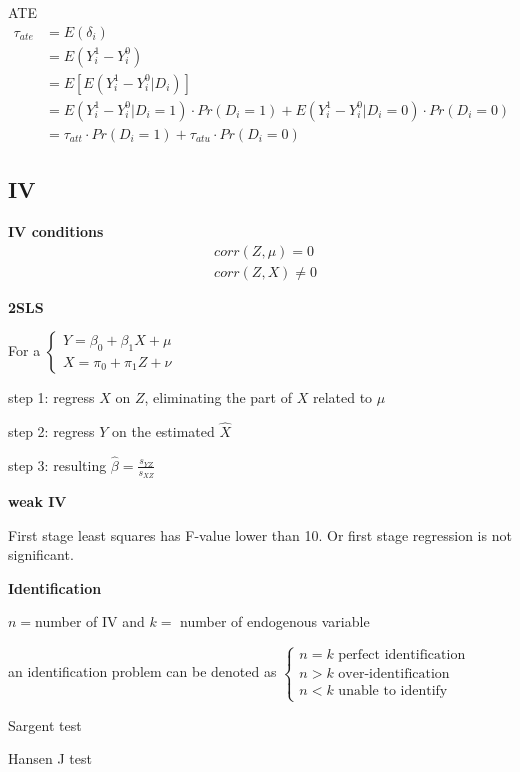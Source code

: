 \documentclass{article}
\begin{document}
ATE
\begin{equation}
\begin{split}
\tau_{ate}&=E(\delta_{i})
\\&=E(Y^{1}_{i}-Y^{0}_{i})
\\&=E[E(Y_{i}^{1}-Y_{i}^{0}|D_{i})]
\\&=E(Y_{i}^{1}-Y_{i}^{0}|D_{i}=1)\cdot Pr(D_{i}=1)+E(Y_{i}^{1}-Y_{i}^{0}|D_{i}=0)\cdot Pr(D_{i}=0)
\\&=\tau_{att}\cdot Pr(D_{i}=1)+\tau_{atu} \cdot Pr(D_{i}=0)
\end{split}
\end{equation}

\subsection{IV}

\textbf{IV conditions}
\begin{align}
  &corr(Z,\mu)=0
  \\&corr(Z,X)\neq 0
\end{align}

\textbf{2SLS}

For a 
$\begin{cases}
Y=\beta_0+\beta_1X+\mu\\
X=\pi_0+\pi_1 Z+\nu
\end{cases}$

step 1: regress $X$ on $Z$, eliminating the part of $X$ related to $\mu$

step 2: regress $Y$ on the estimated $\hat X$

step 3: resulting $\hat{\beta}=\frac{s_{YZ}}{s_{XZ}}$


\textbf{weak IV}

First stage least squares has F-value lower than 10. Or first stage regression is not significant.



\textbf{Identification}

$n=$number of IV and $k=$ number of endogenous variable

an identification problem can be denoted as 
$\begin{cases}
  n=k \text{ perfect identification}
  \\
  n>k \text{ over-identification}
  \\
  n<k \text{ unable to identify}
\end{cases}$

Sargent test

Hansen J test
\end{document}
